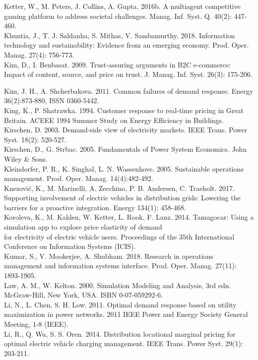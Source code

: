 \documentclass[10pt]{article}
\begin{document}
Ketter, W., M. Peters, J. Collins, A. Gupta. 2016b. A multiagent competitive gaming platform to address societal challenges. Manag. Inf. Syst. Q. 40(2): 447-460.\\
Khuntia, J., T. J. Saldanha, S. Mithas, V. Sambamurthy. 2018. Information technology and sustainability: Evidence from an emerging economy. Prod. Oper. Manag. 27(4): 756-773.\\
Kim, D., I. Benbasat. 2009. Trust-assuring arguments in B2C e-commerce: Impact of content, source, and price on trust. J. Manag. Inf. Syst. 26(3): 175-206.

Kim, J. H., A. Shcherbakova. 2011. Common failures of demand response. Energy 36(2):873-880, ISSN 0360-5442.\\
King, K., P. Shatrawka. 1994. Customer response to real-time pricing in Great Britain. ACEEE 1994 Summer Study on Energy Efficiency in Buildings.\\
Kirschen, D. 2003. Demand-side view of electricity markets. IEEE Trans. Power Syst. 18(2): 520-527.\\
Kirschen, D., G. Strbac. 2005. Fundamentals of Power System Economics. John Wiley \& Sons.\\
Kleindorfer, P. R., K. Singhal, L. N. Wassenhove. 2005. Sustainable operations management. Prod. Oper. Manag. 14(4):482-492.\\
Knezović, K., M. Marinelli, A. Zecchino, P. B. Andersen, C. Traeholt. 2017. Supporting involvement of electric vehicles in distribution grids: Lowering the barriers for a proactive integration. Energy 134(1): 458-468.\\
Koroleva, K., M. Kahlen, W. Ketter, L. Rook, F. Lanz. 2014. Tamagocar: Using a simulation app to explore price elasticity of demand\\
for electricity of electric vehicle users. Proceedings of the 35th International Conference on Information Systems (ICIS).\\
Kumar, S., V. Mookerjee, A. Shubham. 2018. Research in operations management and information systems interface. Prod. Oper. Manag. 27(11): 1893-1905.\\
Law, A. M., W. Kelton. 2000. Simulation Modeling and Analysis, 3rd edn. McGraw-Hill, New York, USA. ISBN 0-07-059292-6.\\
Li, N., L. Chen, S. H. Low. 2011. Optimal demand response based on utility maximization in power networks. 2011 IEEE Power and Energy Society General Meeting, 1-8 (IEEE).\\
Li, R., Q. Wu, S. S. Oren. 2014. Distribution locational marginal pricing for optimal electric vehicle charging management. IEEE Trans. Power Syst. 29(1): 203-211.\\
\end{document}
